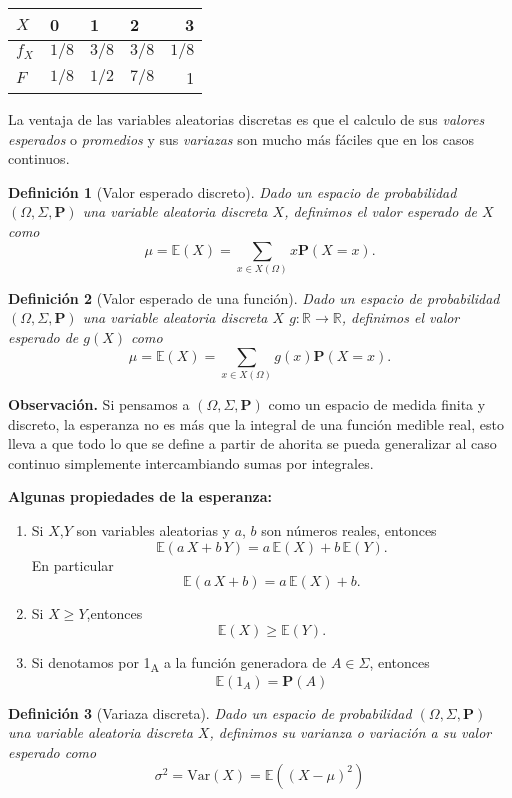 \documentclass[letterpaper]{book}
\newtheorem{def.}{Definici\'on}[section]
\newcommand{\prob}{\textbf{P}}
\newcommand{\esp}{\mathbb E}
\newcommand{\obs}{{\newline \noindent \sc \textbf{Observación. }}}
\newcommand{\om}{\ensuremath{\Omega}}
\newcommand{\sig}{\ensuremath{\Sigma}}
\newcommand{\re}{\ensuremath{\mathbb R }}
\begin{document}
\begin{center}
\begin{tabular}{llllr}
\(X\) & 0 & 1 & 2 & 3\\
\hline
\(f_X\) & \(1/8\) & \(3/8\) & \(3/8\) & \(1/8\)\\
\(F\) & \(1/8\) & \(1/2\) & \(7/8\) & 1\\
\end{tabular}
\end{center}

La ventaja de las variables aleatorias discretas es que el calculo de sus \emph{valores esperados} o \emph{promedios} y sus \emph{variazas} son mucho más fáciles que en los casos continuos.

\begin{def.}[Valor esperado discreto] 
Dado un espacio de probabilidad \((\om,\sig,\prob)\) una variable aleatoria discreta \(X\), definimos el valor esperado de \(X\) como
\[
    \mu=\esp(X)=\sum_{x\in X(\om)} x\prob(X=x).
\]
\end{def.}

\begin{def.}[Valor esperado de una función] 
Dado un espacio de probabilidad \((\om,\sig,\prob)\) una variable aleatoria discreta \(X\) \(g:\re\rightarrow\re\), definimos el valor esperado de \(g(X)\) como
\[
    \mu=\esp(X)=\sum_{x\in X(\om)} g(x)\prob(X=x).
\]
\end{def.}

\obs Si pensamos a \((\om,\sig,\prob)\) como un espacio de medida finita y discreto, la esperanza no es más que la integral de una función medible real, esto lleva a que todo lo que se define a partir de ahorita se pueda generalizar al caso continuo simplemente intercambiando sumas por integrales. 

\textbf{Algunas propiedades de la esperanza:}

\begin{enumerate}
\item Si \(X\),\(Y\) son variables aleatorias y \(a\), \(b\) son números reales, entonces
\[
   \esp(a\,X+b\,Y)=a\,\esp(X)+b\,\esp(Y).
   \]
\noindent En particular
\[
   \esp(a\,X+b)=a\,\esp(X)+b.
   \]
\item Si \(X\geq Y\),entonces
\[
   \esp(X)\geq\esp(Y).
   \]
\item Si denotamos por 1\textsubscript{A} a la función generadora de \(A\in\sig\), entonces
\[
   \esp(1_A)=\prob(A)
   \]
\end{enumerate}

\begin{def.}[Variaza discreta]
Dado un espacio de probabilidad \((\om,\sig,\prob)\) una variable aleatoria discreta \(X\), definimos su varianza o variación a su valor esperado como
\[
    \sigma^2=\mathrm{Var}(X)=\esp((X-\mu)^2)
\]
\end{def.}
\end{document}
